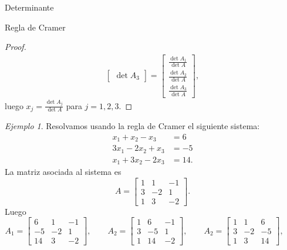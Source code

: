 \documentclass[a4paper,12pt,twoside,spanish,reqno]{amsbook}
\numberwithin{equation}{section}
\theoremstyle{definition}
\theoremstyle{remark}
\newtheorem*{ejemplo*}{Ejemplo}
\begin{document}
\begin{chapter}{Determinante}
\begin{section}{Regla de Cramer}
\begin{proof}
\begin{align*}
\begin{bmatrix}
                 \det A_3 \end{bmatrix} = \begin{bmatrix} \frac{\det A_1}{\det A}\\
                 \frac{\det A_2}{\det A} \\
                 \frac{\det A_3}{\det A}\end{bmatrix},
                 \end{align*}
                 luego $x_j = \displaystyle\frac{\det A_j}{\det A}$ para $j =1,2,3$.
             \end{proof}
             
             \begin{ejemplo*}
                 Resolvamos usando la regla de Cramer el siguiente sistema:
                 \begin{align*}
                 x_1 + x_2 - x_3 &= 6 \\
                 3x_1 -2 x_2 + x_3 &= -5 \\ 
                 x_1 +3 x_2 - 2x_3 &= 14.
                 \end{align*}
                 La matriz asociada al sistema es 
                 $$
                 A= \begin{bmatrix}
                 1 &1  &-1 \\
                 3 &-2  &1 \\ 
                 1 &3 &-2
                 \end{bmatrix}.
                 $$
                 Luego 
                 $$
                 A_1 = \begin{bmatrix}
                 6 &1  &-1 \\
                 -5 &-2  &1 \\ 
                 14 &3 &-2
                 \end{bmatrix}, \qquad
                 A_2 = \begin{bmatrix}
                 1 &6  &-1 \\
                 3 &-5  &1 \\ 
                 1 &14 &-2
                 \end{bmatrix}, \qquad
                 A_2 = \begin{bmatrix}
                 1 &1  &6 \\
                 3 &-2  &-5 \\ 
                 1 &3 &14
                 \end{bmatrix}, \qquad
                 $$

\end{ejemplo*}
\end{section}
\end{chapter}
\end{document}
